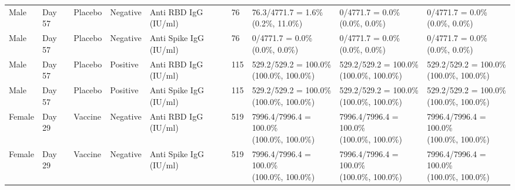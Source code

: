 \documentclass[]{book}
\theoremstyle{definition}
\theoremstyle{definition}
\theoremstyle{definition}
\newcommand{\1}{\mathbbm{1}}
\begin{document}
\begin{landscape}
\begin{ThreePartTable}
\begin{longtable}[t]{>{\raggedright\arraybackslash}p{2.7cm}llllllll}
\hspace{1em}Male & Day 57 & Placebo & Negative & Anti RBD IgG (IU/ml) & 76 & \makecell[l]{76.3/4771.7 = 1.6\%\\(0.2\%, 11.0\%)} & \makecell[l]{0/4771.7 = 0.0\%\\(0.0\%, 0.0\%)} & \makecell[l]{0/4771.7 = 0.0\%\\(0.0\%, 0.0\%)}\\
\hspace{1em}Male & Day 57 & Placebo & Negative & Anti Spike IgG (IU/ml) & 76 & \makecell[l]{0/4771.7 = 0.0\%\\(0.0\%, 0.0\%)} & \makecell[l]{0/4771.7 = 0.0\%\\(0.0\%, 0.0\%)} & \makecell[l]{0/4771.7 = 0.0\%\\(0.0\%, 0.0\%)}\\
\hspace{1em}Male & Day 57 & Placebo & Positive & Anti RBD IgG (IU/ml) & 115 & \makecell[l]{529.2/529.2 = 100.0\%\\(100.0\%, 100.0\%)} & \makecell[l]{529.2/529.2 = 100.0\%\\(100.0\%, 100.0\%)} & \makecell[l]{529.2/529.2 = 100.0\%\\(100.0\%, 100.0\%)}\\
\hspace{1em}Male & Day 57 & Placebo & Positive & Anti Spike IgG (IU/ml) & 115 & \makecell[l]{529.2/529.2 = 100.0\%\\(100.0\%, 100.0\%)} & \makecell[l]{529.2/529.2 = 100.0\%\\(100.0\%, 100.0\%)} & \makecell[l]{529.2/529.2 = 100.0\%\\(100.0\%, 100.0\%)}\\
\hspace{1em}Female & Day 29 & Vaccine & Negative & Anti RBD IgG (IU/ml) & 519 & \makecell[l]{7996.4/7996.4 = 100.0\%\\(100.0\%, 100.0\%)} & \makecell[l]{7996.4/7996.4 = 100.0\%\\(100.0\%, 100.0\%)} & \makecell[l]{7996.4/7996.4 = 100.0\%\\(100.0\%, 100.0\%)}\\
\hspace{1em}Female & Day 29 & Vaccine & Negative & Anti Spike IgG (IU/ml) & 519 & \makecell[l]{7996.4/7996.4 = 100.0\%\\(100.0\%, 100.0\%)} & \makecell[l]{7996.4/7996.4 = 100.0\%\\(100.0\%, 100.0\%)} & \makecell[l]{7996.4/7996.4 = 100.0\%\\(100.0\%, 100.0\%)}\\

\end{longtable}
\end{ThreePartTable}
\end{landscape}
\end{document}
